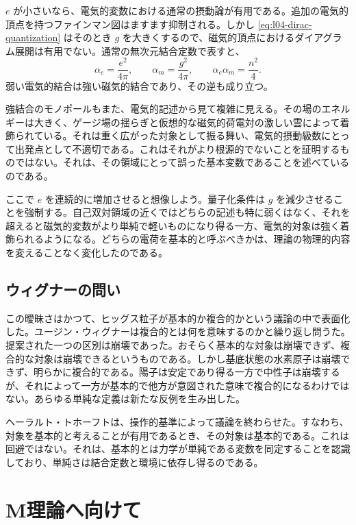 \(e\) が小さいなら、電気的変数における通常の摂動論が有用である。追加の電気的頂点を持つファインマン図はますます抑制される。しかし \eqref{eq:l04-dirac-quantization} はそのとき \(g\) を大きくするので、磁気的頂点におけるダイアグラム展開は有用でない。通常の無次元結合定数で表すと、
\begin{equation}
  \alpha_e=\frac{e^2}{4\pi},
  \qquad
  \alpha_m=\frac{g^2}{4\pi},
  \qquad
  \alpha_e\alpha_m=\frac{n^2}{4}.
  \label{eq:l04-dual-couplings}
\end{equation}
弱い電気的結合は強い磁気的結合であり、その逆も成り立つ。

強結合のモノポールもまた、電気的記述から見て複雑に見える。その場のエネルギーは大きく、ゲージ場の揺らぎと仮想的な磁気的荷電対の激しい雲によって着飾られている。それは重く広がった対象として振る舞い、電気的摂動級数にとって出発点として不適切である。これはそれがより根源的でないことを証明するものではない。それは、その領域にとって誤った基本変数であることを述べているのである。

ここで \(e\) を連続的に増加させると想像しよう。量子化条件は \(g\) を減少させることを強制する。自己双対領域の近くではどちらの記述も特に弱くはなく、それを超えると磁気的変数がより単純で軽いものになり得る一方、電気的対象は強く着飾られるようになる。どちらの電荷を基本的と呼ぶべきかは、理論の物理的内容を変えることなく変化したのである。

\subsection{ウィグナーの問い}

この曖昧さはかつて、ヒッグス粒子が基本的か複合的かという議論の中で表面化した。ユージン・ウィグナーは複合的とは何を意味するのかと繰り返し問うた。提案された一つの区別は崩壊であった。おそらく基本的な対象は崩壊できず、複合的な対象は崩壊できるというものである。しかし基底状態の水素原子は崩壊できず、明らかに複合的である。陽子は安定であり得る一方で中性子は崩壊するが、それによって一方が基本的で他方が意図された意味で複合的になるわけではない。あらゆる単純な定義は新たな反例を生み出した。

ヘーラルト・トホーフトは、操作的基準によって議論を終わらせた。すなわち、対象を基本的と考えることが有用であるとき、その対象は基本的である。これは回避ではない。それは、基本的とは力学が単純である変数を同定することを認識しており、単純さは結合定数と環境に依存し得るのである。

\section{M理論へ向けて}

